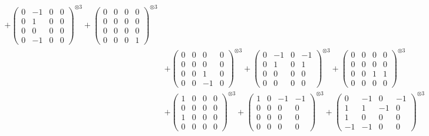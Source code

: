 \documentclass{article}
\begin{document}
{\begin{align}
            + \begin{pmatrix} 0 & -1 & 0 & 0 \\ 0 & 1 & 0 & 0 \\ 0 & 0 & 0 & 0 \\ 0 & -1 & 0 & 0 \end{pmatrix}^{\otimes 3} 
            + \begin{pmatrix} 0 & 0 & 0 & 0 \\ 0 & 0 & 0 & 0 \\ 0 & 0 & 0 & 0 \\ 0 & 0 & 0 & 1 \end{pmatrix}^{\otimes 3} \\
        &+ \label{Rs16-Rc11-Solution-29-c10} \begin{pmatrix} 0 & 0 & 0 & 0 \\ 0 & 0 & 0 & 0 \\ 0 & 0 & 1 & 0 \\ 0 & 0 & -1 & 0 \end{pmatrix}^{\otimes 3} 
            + \begin{pmatrix} 0 & -1 & 0 & -1 \\ 0 & 1 & 0 & 1 \\ 0 & 0 & 0 & 0 \\ 0 & 0 & 0 & 0 \end{pmatrix}^{\otimes 3} 
            + \begin{pmatrix} 0 & 0 & 0 & 0 \\ 0 & 0 & 0 & 0 \\ 0 & 0 & 1 & 1 \\ 0 & 0 & 0 & 0 \end{pmatrix}^{\otimes 3} \\
        &+ \label{Rs16-Rc11-Solution-29-c13} \begin{pmatrix} 1 & 0 & 0 & 0 \\ 0 & 0 & 0 & 0 \\ 1 & 0 & 0 & 0 \\ 0 & 0 & 0 & 0 \end{pmatrix}^{\otimes 3} 
            + \begin{pmatrix} 1 & 0 & -1 & -1 \\ 0 & 0 & 0 & 0 \\ 0 & 0 & 0 & 0 \\ 0 & 0 & 0 & 0 \end{pmatrix}^{\otimes 3} 
            + \begin{pmatrix} 0 & -1 & 0 & -1 \\ 1 & 1 & -1 & 0 \\ 1 & 0 & 0 & 0 \\ -1 & -1 & 0 & 0 \end{pmatrix}^{\otimes 3} \\

\end{align}}
\end{document}
